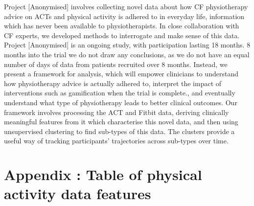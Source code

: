 \documentclass{article}
\begin{document}
Project [Anonymised] involves collecting novel data about how CF physiotherapy advice on ACTs and physical activity is adhered to in everyday life, information which has never been available to physiotherapists. In close collaboration with CF experts, we developed methods to interrogate and make sense of this data. Project [Anonymised] is an ongoing study, with participation lasting 18 months. 8 months into the trial we do not draw any conclusions, as we do not have an equal number of days of data from patients recruited over 8 months. Instead, we present a framework for analysis, which will empower clinicians to understand how physiotherapy advice is actually adhered to, interpret the impact of interventions such as gamification when the trial is complete., and eventually understand what type of physiotherapy leads to better clinical outcomes. Our framework involves processing the ACT and Fitbit data, deriving clinically meaningful features from it which characterise this novel data, and then using unsupervised clustering to find sub-types of this data. The clusters provide a useful way of tracking participants' trajectories across sub-types over time. 





\appendix

\section{Appendix : Table of physical activity data features}
\end{document}
